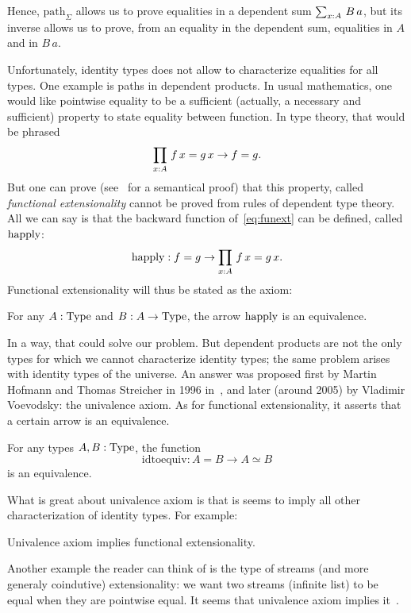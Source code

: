 Hence, $\mathrm{path}_\Sigma$ allows us to prove equalities in a
dependent sum $\sum_{x:A}\, B\, a$, but its inverse allows us to prove,
from an equality in the dependent sum, equalities in $A$ and in $B\, a$.

Unfortunately, identity types does not allow to characterize
equalities for all types. One example is paths in dependent
products. In usual mathematics, one would like pointwise equality to
be a sufficient (actually, a necessary and sufficient) property to
state equality between function. In type theory, that would be phrased
\begin{equation}\label{eq:funext}
 \prod_{x:A}\, f\, x = g\, x \to f = g.  
\end{equation}
But one can prove (see~\cite{streicher93} for a semantical proof) that
this property, called {\em functional extensionality} cannot be proved
from rules of dependent type theory.
All we can say is that the backward function of~\ref{eq:funext} can be
defined, called $\mathrm{happly}$:
\[ \mathrm{happly}: f = g \to \prod_{x:A}\, f\, x = g\, x. \]
Functional extensionality will thus be stated as the axiom:
\begin{ax}
  For any $A:\operatorname{Type}$ and $B:A\to\operatorname{Type}$, the arrow $\mathrm{happly}$ is an equivalence.
\end{ax}
In a way, that could solve our problem. But dependent products are not
the only types for which we cannot characterize identity types; the
same problem arises with identity types of the universe. An answer was
proposed first by Martin Hofmann and Thomas Streicher in 1996
in~\cite{Hofmann96thegroupoid}, and later (around 2005) by Vladimir
Voevodsky: the univalence axiom. As for functional extensionality, it
asserts that a certain arrow is an equivalence.

\begin{ax}
  For any types $A,B:\operatorname{Type}$, the function
  \[ \mathrm{idtoequiv} : A = B \to A\simeq B \]
  is an equivalence.
\end{ax}

What is great about univalence axiom is that is seems to imply all
other characterization of identity types. For example:
\begin{lem}
  Univalence axiom implies functional extensionality.
\end{lem}
Another example the reader can think of is the type of streams (and more generaly coindutive) extensionality:
we want two streams (infinite list) to be equal when they are
pointwise equal. It seems that univalence axiom implies it~\cite{licata14uafs}.

